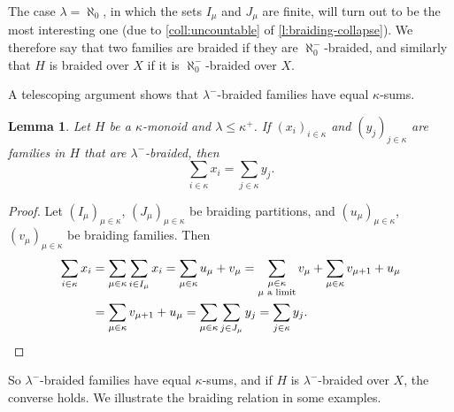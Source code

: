 \documentclass[a4paper,11pt,oneside]{amsart}
\newtheorem{lemma}[teor]{Lemma}
\theoremstyle{remark}
\newcommand{\defit}[1]{\textsf{#1}}
\begin{document}
The case $\lambda=\aleph_0$, in which the sets $I_\mu$ and $J_\mu$ are finite, will turn out to be the most interesting one (due to \ref{coll:uncountable} of \cref{l:braiding-collapse}). We therefore say that two families are \defit{braided} if they are $\aleph_0^-$-braided, and similarly that $H$ is \defit{braided over $X$} if it is $\aleph_0^-$-braided over $X$.

A telescoping argument shows that $\lambda^-$-braided families have equal $\kappa$-sums.

\begin{lemma} \label{l:telescope}
  Let $H$ be a $\kappa$-monoid and $\lambda \le \kappa^+$.
  If $(x_i)_{i \in \kappa}$ and $(y_j)_{j \in \kappa}$ are families in $H$ that are $\lambda^-$-braided, then
  \[
    \sum_{i \in \kappa} x_i = \sum_{j \in \kappa} y_j.
  \]
\end{lemma}

\begin{proof}
  Let $(I_\mu)_{\mu \in \kappa}$, $(J_\mu)_{\mu \in \kappa}$ be braiding partitions, and $(u_\mu)_{\mu \in \kappa}$, $(v_\mu)_{\mu \in \kappa}$ be braiding families.
  Then
  \[
    \begin{split}
      \sum_{i \in \kappa} x_i &= \sum_{\mu \in \kappa} \sum_{i \in I_\mu} x_i = \sum_{\mu \in \kappa} u_\mu + v_\mu = \sum_{\substack{\mu \in \kappa \\ \text{$\mu$ a limit}}} v_\mu + \sum_{\mu \in \kappa} v_{\mu+1} + u_\mu \\
      &=
      \sum_{\mu \in \kappa} v_{\mu+1} + u_\mu = \sum_{\mu \in \kappa} \sum_{j \in J_\mu} y_j = \sum_{j \in \kappa} y_j. \qedhere
    \end{split}
  \]
\end{proof}

So $\lambda^-$-braided families have equal $\kappa$-sums, and if $H$ is $\lambda^-$-braided over $X$, the converse holds.
We illustrate the braiding relation in some examples.
\end{document}
